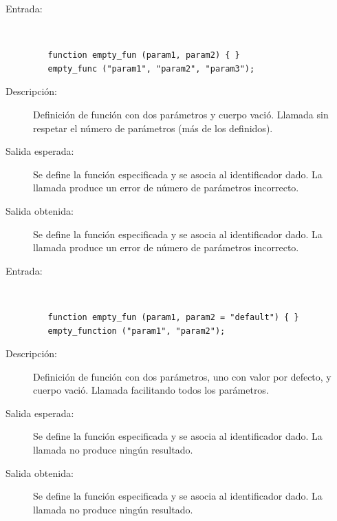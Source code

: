 \begin{framed}
	\begin{description}
		\item [Entrada:] \hfill \\
\begin{lstlisting}
   function empty_fun (param1, param2) { } 
   empty_func ("param1", "param2", "param3");
\end{lstlisting}
		\item [Descripción:] Definición de función con dos parámetros y cuerpo vació. Llamada sin respetar el número de parámetros (más de los definidos). 
		\item [Salida esperada:] Se define la función especificada y se asocia al identificador dado. La llamada produce un error de número de parámetros incorrecto. 
		\item [Salida obtenida:] Se define la función especificada y se asocia al identificador dado. La llamada produce un error de número de parámetros incorrecto.
	\end{description}
\end{framed}

\begin{framed}
	\begin{description}
		\item [Entrada:] \hfill \\
\begin{lstlisting}
   function empty_fun (param1, param2 = "default") { } 
   empty_function ("param1", "param2");
\end{lstlisting}
		\item [Descripción:] Definición de función con dos parámetros, uno con valor por defecto, y cuerpo vació. Llamada facilitando todos los parámetros.
		\item [Salida esperada:] Se define la función especificada y se asocia al identificador dado. La llamada no produce ningún resultado.
		\item [Salida obtenida:] Se define la función especificada y se asocia al identificador dado. La llamada no produce ningún resultado.
	\end{description}
\end{framed}


